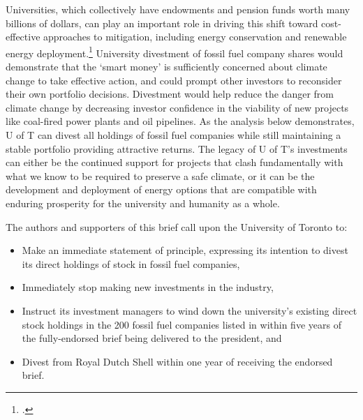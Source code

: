 \documentclass[10pt]{article}
\begin{document}
Universities, which collectively have endowments and pension funds worth many billions of dollars, can play an important role in driving this shift toward cost-effective approaches to  mitigation, including energy conservation and renewable energy deployment.\footcite[The consultancy McKinsey \& Company has studied and ranked global options for mitigating GHG pollution, considering their cost, plausible deployment speed, and the scale at which they can help solve the problem. See: ][p. 8]{McKinseyCurve}
University divestment of fossil fuel company shares would demonstrate that the `smart money' is sufficiently concerned about climate change to take effective action, and could prompt other investors to reconsider their own portfolio decisions. 
Divestment would help reduce the danger from climate change by decreasing investor confidence in the viability of new projects like coal-fired power plants and oil pipelines.
As the analysis below demonstrates, U of T can divest all holdings of fossil fuel companies while still maintaining a stable portfolio providing attractive returns.
The legacy of U of T's investments can either be the continued support for projects that clash fundamentally with what we know to be required to preserve a safe climate, or it can be the development and deployment of energy options that are compatible with enduring prosperity for the university and humanity as a whole.



The authors and supporters of this brief call upon the University of Toronto to:
\begin{itemize}
	\item Make an immediate statement of principle, expressing its intention to divest its direct holdings of stock in fossil fuel companies,
	\item Immediately stop making new investments in the industry,
	\item Instruct its investment managers to wind down the university's existing direct stock holdings in the 200 fossil fuel companies listed in  within five years of the fully-endorsed brief being delivered to the president, and
	\item Divest from Royal Dutch Shell within one year of receiving the endorsed brief.
\end{itemize}
\end{document}
